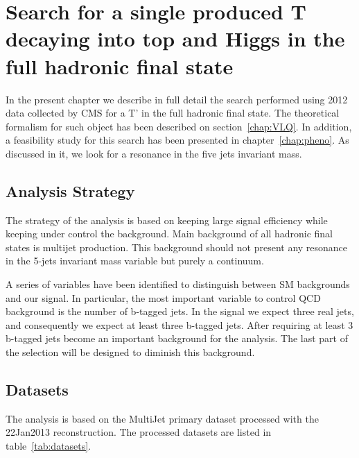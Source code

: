 \chapter[Single VLQ search]{Search for a single produced T decaying into top and Higgs in the full hadronic final state}
\label{chap:search}

In the present chapter we describe in full detail the search performed using 2012 data collected by CMS for a T' in the full hadronic final state. The theoretical formalism for such object has been described on section~\ref{chap:VLQ}. In addition, a feasibility study for this search has been presented in chapter~\ref{chap:pheno}. As discussed in it, we look for a resonance in the five jets invariant mass.

\section{Analysis Strategy}
\label{sec:stra}

The strategy of the analysis is based on keeping large signal efficiency while keeping under control the background. Main background of all hadronic final states is multijet production. This background should not present any resonance in the 5-jets invariant mass variable but purely a continuum. %

A series of variables have been identified to distinguish between SM backgrounds and our signal. In particular, the most important variable to control QCD background is the number of b-tagged jets. In the signal we expect three real jets, and consequently we expect at least three b-tagged jets. After requiring at least 3 b-tagged jets \ttbar become an important background for the analysis. The last part of the selection will be designed to diminish this background. 

\section{Datasets}
\label{sec:data}

The analysis is based on the MultiJet primary dataset processed with the 22Jan2013 reconstruction. The processed datasets are listed in table~\ref{tab:datasets}.

